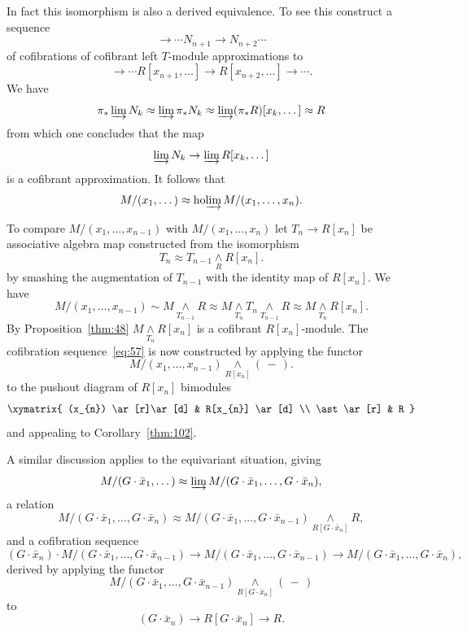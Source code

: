 \documentclass{amsart}
\theoremstyle{definition}
\theoremstyle{remark}
\newcommand{\slot}{\,-\,}
\DeclareMathOperator{\ho}{ho}
\newcommand{\smashove}[1]{\underset{#1}{\wedge}}
\newcommand{\gbar}{\bar}
\newcommand{\hocolim}{\ho\!\varinjlim}
\begin{document}
In fact this isomorphism is also a derived
equivalence.   To see this construct a sequence
\[
\to\cdots N_{n+1}\to N_{n+2}\cdots
\]
of cofibrations of cofibrant left $T$-module approximations to 
\[
\to\cdots R[x_{n+1},\dots] \to R[x_{n+2},\dots] \to \cdots.
\]
We have 
\[
\pi_{\ast}\varinjlim N_{k} \approx \varinjlim \pi_{\ast}N_{k} \approx
\varinjlim (\pi_{\ast}R)[x_{k},\dots] \approx R
\]
from which one concludes that the map 
\[
\varinjlim N_{k} \to \varinjlim R[x_{k},\dots]
\]
is a cofibrant approximation.  It follows that
\[
M/(x_{1},\dots) \approx 
\hocolim M/(x_{1},\dots, x_{n}).
\]

To compare $M/(x_{1},\dots, x_{n-1})$ with $M/(x_{1},\dots, x_{n})$
let $T_{n}\to R[x_{n}]$ be associative algebra map constructed from
the isomorphism
\[
T_{n}\approx T_{n-1}\underset{R}{\wedge}R[x_{n}].
\]
by smashing the augmentation of $T_{n-1}$ with the identity map of
$R[x_{n}]$.   We have
\[
M/(x_{1},\dots,x_{n-1}) \sim 
M\underset{T_{n-1}}{\wedge}R \approx
M\underset{T_{n}}{\wedge}T_{n}\underset{T_{n-1}}{\wedge}R \approx
M\underset{T_{n}}{\wedge}R[x_{n}].
\]
By Proposition~\ref{thm:48} $M\underset{T_{n}}{\wedge}R[x_{n}]$ is a
cofibrant $R[x_{n}]$-module.  The cofibration sequence~\eqref{eq:57}
is now constructed by applying the functor
\begin{equation}
\label{eq:80}
M/(x_{1},\dots, x_{n-1})\smashove{R[x_{n}]} (\slot).
\end{equation}
to the pushout diagram of $R[x_{n}]$ bimodules 
\begin{equation}
\label{eq:40}
\xymatrix{
(x_{n}) \ar[r]\ar[d]  & R[x_{n}]  \ar[d] \\
\ast \ar[r] & R
}
\end{equation}
and appealing to Corollary~\ref{thm:102}.


A similar discussion applies to the equivariant situation, giving 
\[
M/(G\cdot \gbar{x}_{1},\dots) \approx \varinjlim M/(G\cdot
\gbar{x}_{1},\dots, G\cdot \gbar{x}_{n}),
\]
a relation 
\[
M/(G\cdot \gbar{x}_{1},\dots, G\cdot \gbar{x}_{n}) \approx M/(G\cdot
\gbar{x}_{1},\dots, G\cdot \gbar{x}_{n-1})
\smashove{R[G\cdot\gbar{x}_{n}]}R,
\]
and a cofibration sequence 
\[
(G\cdot \gbar x_{n})\cdot M/(G\cdot \gbar{x}_{1},\dots, G\cdot
\gbar{x}_{n-1})\to M/(G\cdot \gbar{x}_{1},\dots, G\cdot
\gbar{x}_{n-1}) \to M/(G\cdot \gbar{x}_{1},\dots, G\cdot
\gbar{x}_{n}),
\]
derived by applying the functor 
\[
M/(G\cdot \gbar{x}_{1},\dots, G\cdot \gbar{x}_{n-1})
\smashove{R[G\cdot\gbar{x}_{n}]}(\slot)
\]
to
\[
(G\cdot \gbar x_{n})\to R[G\cdot\gbar{x}_{n}]\to R.
\]
\end{document}
